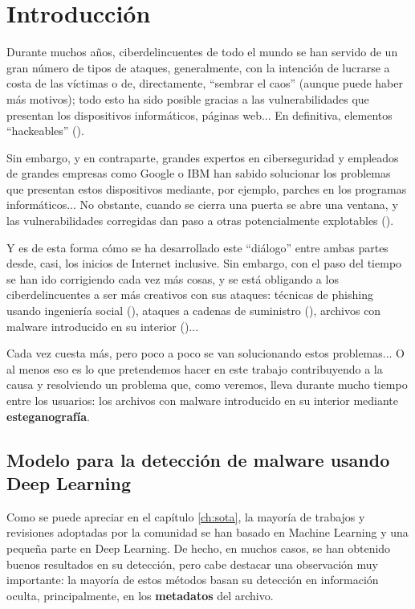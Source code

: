 \chapter{Introducción}
\label{ch:intro}

Durante muchos años, ciberdelincuentes de todo el mundo se han servido de un gran número de tipos de ataques, generalmente, con la intención de lucrarse a costa de las víctimas o de, directamente, ``sembrar el caos'' (aunque puede haber más motivos); todo esto ha sido posible gracias a las vulnerabilidades que presentan los dispositivos informáticos, páginas web... En definitiva, elementos ``hackeables'' (\cite{historia-ciber}).%

Sin embargo, y en contraparte, grandes expertos en ciberseguridad y empleados de grandes empresas como Google o IBM han sabido solucionar los problemas que presentan estos dispositivos mediante, por ejemplo, parches en los programas informáticos... No obstante, cuando se cierra una puerta se abre una ventana, y las vulnerabilidades corregidas dan paso a otras potencialmente explotables (\cite{guerra-ciber}).%

Y es de esta forma cómo se ha desarrollado este ``diálogo'' entre ambas partes desde, casi, los inicios de Internet inclusive. Sin embargo, con el paso del tiempo se han ido corrigiendo cada vez más cosas, y se está obligando a los ciberdelincuentes a ser más creativos con sus ataques: técnicas de phishing usando ingeniería social (\cite{phishing}), ataques a cadenas de suministro (\cite{cadena-suministro}), archivos con malware introducido en su interior (\cite{malware-imagen})... %

Cada vez cuesta más, pero poco a poco se van solucionando estos problemas... O al menos eso es lo que pretendemos hacer en este trabajo contribuyendo a la causa y resolviendo un problema que, como veremos, lleva durante mucho tiempo entre los usuarios: los archivos con malware introducido en su interior mediante \textbf{esteganografía}.

\section{Modelo para la detección de malware usando Deep Learning}

Como se puede apreciar en el capítulo \ref{ch:sota}, la mayoría de trabajos y revisiones adoptadas por la comunidad se han basado en Machine Learning y una pequeña parte en Deep Learning. De hecho, en muchos casos, se han obtenido buenos resultados en su detección, pero cabe destacar una observación muy importante: la mayoría de estos métodos basan su detección en información oculta, principalmente, en los \textbf{metadatos} del archivo.


